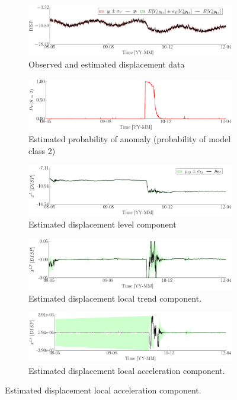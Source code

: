 \begin{figure}[h!]
\centering
\begin{subfigure}{\linewidth}
\includegraphics[width=0.9\linewidth]{./docfigs/Example_DISPSIM_ANOMALY/optim_param_optim_initialhiddenstate/DISP_ObservedPredicted.pdf}
\caption{Observed and estimated displacement data}
\end{subfigure}
\begin{subfigure}{\linewidth}
\includegraphics[width=0.9\linewidth]{./docfigs/Example_DISPSIM_ANOMALY/optim_param_optim_initialhiddenstate/ModelProbability.pdf} 
\caption{Estimated probability of anomaly (probability of model class 2)}
\end{subfigure}
\begin{subfigure}{\linewidth}
\includegraphics[width=0.9\linewidth]{./docfigs/Example_DISPSIM_ANOMALY/optim_param_optim_initialhiddenstate/DISP_LL_1.pdf} 
\caption{Estimated displacement level component}
\end{subfigure}
\begin{subfigure}{\linewidth}
\includegraphics[width=0.9\linewidth]{./docfigs/Example_DISPSIM_ANOMALY/optim_param_optim_initialhiddenstate/DISP_LT_2.pdf}
\caption{Estimated displacement local trend component.}
\end{subfigure}
\begin{subfigure}{\linewidth}
\includegraphics[width=0.9\linewidth]{./docfigs/Example_DISPSIM_ANOMALY/optim_param_optim_initialhiddenstate/DISP_LAc_3.pdf}
\caption{Estimated displacement local acceleration component.}
\end{subfigure}
\end{figure}
